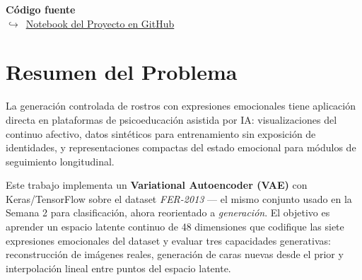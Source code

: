 \documentclass[10pt,a4paper,twocolumn]{article}
\newcommand{\githuburl}{https://github.com/georgenton/UIDE-Aprendizaje-Profundo/blob/main/semana-3/VAE\_FER2013\_Grupo5.ipynb}
\begin{document}

\begin{codigofuente}
\textbf{Código fuente}\\[2pt]
$\hookrightarrow$~\href{\githuburl}{Notebook del Proyecto en GitHub}
\end{codigofuente}

\section{Resumen del Problema}

La generación controlada de rostros con expresiones emocionales tiene aplicación directa en plataformas de psicoeducación asistida por IA: visualizaciones del continuo afectivo, datos sintéticos para entrenamiento sin exposición de identidades, y representaciones compactas del estado emocional para módulos de seguimiento longitudinal.

Este trabajo implementa un \textbf{Variational Autoencoder (VAE)} con Keras/TensorFlow sobre el dataset \textit{FER-2013} — el mismo conjunto usado en la Semana 2 para clasificación, ahora reorientado a \textit{generación}. El objetivo es aprender un espacio latente continuo de 48 dimensiones que codifique las siete expresiones emocionales del dataset y evaluar tres capacidades generativas: reconstrucción de imágenes reales, generación de caras nuevas desde el prior y interpolación lineal entre puntos del espacio latente.
\end{document}
